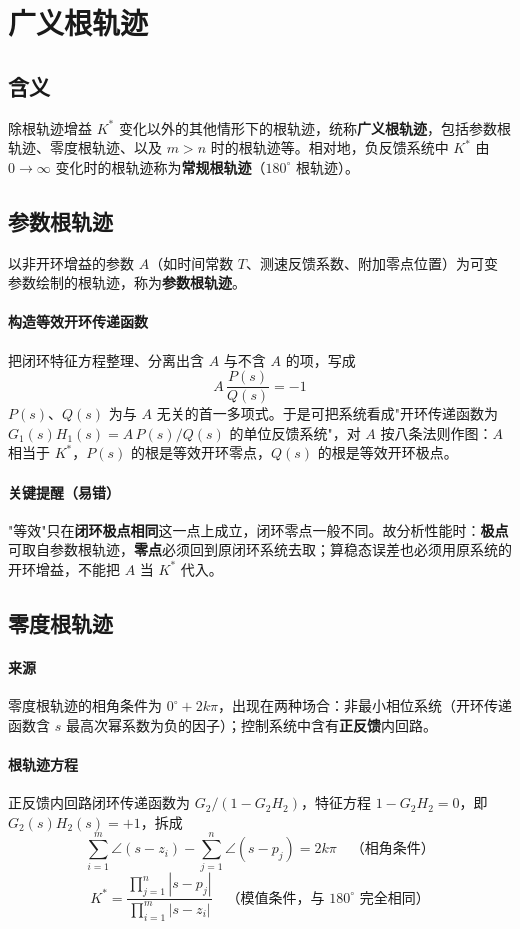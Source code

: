\medskip

\section{广义根轨迹}
\subsection{含义}
除根轨迹增益 $K^*$ 变化以外的其他情形下的根轨迹，统称\textbf{广义根轨迹}，包括参数根轨迹、零度根轨迹、以及 $m>n$ 时的根轨迹等。相对地，负反馈系统中 $K^*$ 由 $0\to\infty$ 变化时的根轨迹称为\textbf{常规根轨迹}（$180^\circ$ 根轨迹）。

\subsection{参数根轨迹}
以非开环增益的参数 $A$（如时间常数 $T$、测速反馈系数、附加零点位置）为可变参数绘制的根轨迹，称为\textbf{参数根轨迹}。

\paragraph{构造等效开环传递函数}把闭环特征方程整理、分离出含 $A$ 与不含 $A$ 的项，写成
\[
A\,\frac{P(s)}{Q(s)}=-1
\]
$P(s)$、$Q(s)$ 为与 $A$ 无关的首一多项式。于是可把系统看成"开环传递函数为 $G_1(s)H_1(s)=A\,P(s)/Q(s)$ 的单位反馈系统"，对 $A$ 按八条法则作图：$A$ 相当于 $K^*$，$P(s)$ 的根是等效开环零点，$Q(s)$ 的根是等效开环极点。

\paragraph{关键提醒（易错）}"等效"只在\textbf{闭环极点相同}这一点上成立，闭环零点一般不同。故分析性能时：\textbf{极点}可取自参数根轨迹，\textbf{零点}必须回到原闭环系统去取；算稳态误差也必须用原系统的开环增益，不能把 $A$ 当 $K^*$ 代入。

\subsection{零度根轨迹}
\paragraph{来源}零度根轨迹的相角条件为 $0^\circ+2k\pi$，出现在两种场合：非最小相位系统（开环传递函数含 $s$ 最高次幂系数为负的因子）；控制系统中含有\textbf{正反馈}内回路。

\paragraph{根轨迹方程}正反馈内回路闭环传递函数为 $G_2/(1-G_2H_2)$，特征方程 $1-G_2H_2=0$，即 $G_2(s)H_2(s)=+1$，拆成
\[
\sum_{i=1}^{m}\angle(s-z_i)-\sum_{j=1}^{n}\angle(s-p_j)=2k\pi
\quad\text{（相角条件）}
\]
\[
K^*=\frac{\displaystyle\prod_{j=1}^{n}|s-p_j|}{\displaystyle\prod_{i=1}^{m}|s-z_i|}
\quad\text{（模值条件，与 $180^\circ$ 完全相同）}
\]

